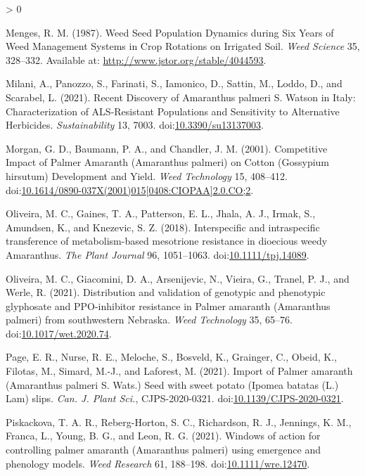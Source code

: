 \documentclass[utf8]{frontiersSCNS}
\newlength{\cslhangindent}
\newenvironment{CSLReferences}[2] %
 {%
  \setlength{\parindent}{0pt}
  \ifodd #1 \everypar{\setlength{\hangindent}{\cslhangindent}}\ignorespaces\fi
  \ifnum #2 > 0
  \setlength{\parskip}{#2\baselineskip}
  \fi
 }%
 {}
\begin{document}
\begin{CSLReferences}{1}{0}
\leavevmode\hypertarget{ref-menges1987}{}%
Menges, R. M. (1987). Weed {Seed Population Dynamics} during {Six Years}
of {Weed Management Systems} in {Crop Rotations} on {Irrigated Soil}.
\emph{Weed Science} 35, 328--332. Available at:
\url{http://www.jstor.org/stable/4044593}.

\leavevmode\hypertarget{ref-milani2021}{}%
Milani, A., Panozzo, S., Farinati, S., Iamonico, D., Sattin, M., Loddo,
D., and Scarabel, L. (2021). Recent {Discovery} of {Amaranthus} palmeri
{S}. {Watson} in {Italy}: {Characterization} of {ALS}-{Resistant
Populations} and {Sensitivity} to {Alternative Herbicides}.
\emph{Sustainability} 13, 7003.
doi:\href{https://doi.org/10.3390/su13137003}{10.3390/su13137003}.

\leavevmode\hypertarget{ref-morgan2001}{}%
Morgan, G. D., Baumann, P. A., and Chandler, J. M. (2001). Competitive
{Impact} of {Palmer Amaranth} ({Amaranthus} palmeri) on {Cotton}
({Gossypium} hirsutum) {Development} and {Yield}. \emph{Weed Technology}
15, 408--412.
doi:\href{https://doi.org/10.1614/0890-037X(2001)015\%5B0408:CIOPAA\%5D2.0.CO;2}{10.1614/0890-037X(2001)015{[}0408:CIOPAA{]}2.0.CO;2}.

\leavevmode\hypertarget{ref-oliveira2018}{}%
Oliveira, M. C., Gaines, T. A., Patterson, E. L., Jhala, A. J., Irmak,
S., Amundsen, K., and Knezevic, S. Z. (2018). Interspecific and
intraspecific transference of metabolism-based mesotrione resistance in
dioecious weedy {Amaranthus}. \emph{The Plant Journal} 96, 1051--1063.
doi:\href{https://doi.org/10.1111/tpj.14089}{10.1111/tpj.14089}.

\leavevmode\hypertarget{ref-oliveira2021a}{}%
Oliveira, M. C., Giacomini, D. A., Arsenijevic, N., Vieira, G., Tranel,
P. J., and Werle, R. (2021). Distribution and validation of genotypic
and phenotypic glyphosate and {PPO}-inhibitor resistance in {Palmer}
amaranth ({Amaranthus} palmeri) from southwestern {Nebraska}. \emph{Weed
Technology} 35, 65--76.
doi:\href{https://doi.org/10.1017/wet.2020.74}{10.1017/wet.2020.74}.

\leavevmode\hypertarget{ref-page2021}{}%
Page, E. R., Nurse, R. E., Meloche, S., Bosveld, K., Grainger, C.,
Obeid, K., Filotas, M., Simard, M.-J., and Laforest, M. (2021). Import
of {Palmer} amaranth ({Amaranthus} palmeri {S}. {Wats}.) Seed with sweet
potato ({Ipomea} batatas ({L}.) {Lam}) slips. \emph{Can. J. Plant Sci.},
CJPS-2020-0321.
doi:\href{https://doi.org/10.1139/CJPS-2020-0321}{10.1139/CJPS-2020-0321}.

\leavevmode\hypertarget{ref-piskackova2021}{}%
Piskackova, T. A. R., Reberg-Horton, S. C., Richardson, R. J., Jennings,
K. M., Franca, L., Young, B. G., and Leon, R. G. (2021). Windows of
action for controlling palmer amaranth ({Amaranthus} palmeri) using
emergence and phenology models. \emph{Weed Research} 61, 188--198.
doi:\href{https://doi.org/10.1111/wre.12470}{10.1111/wre.12470}.


\end{CSLReferences}
\end{document}
